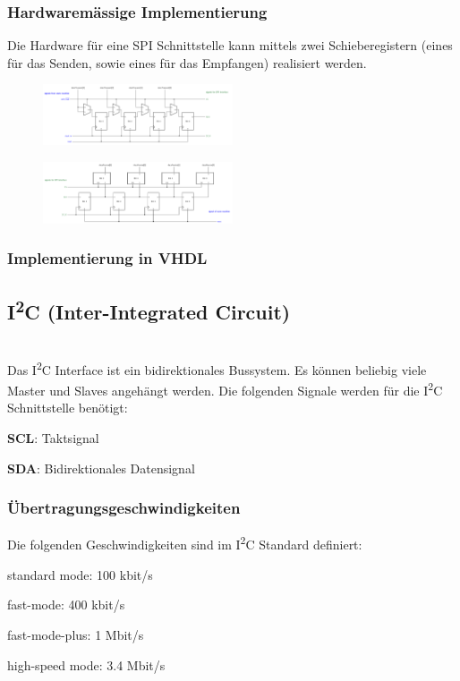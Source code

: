\subsubsection{Hardwaremässige Implementierung}
Die Hardware für eine SPI Schnittstelle kann mittels zwei Schieberegistern (eines für das Senden, sowie eines für das Empfangen) realisiert werden.
\begin{multicols}{2}
    \begin{figure}[H]
        \includegraphics[width=0.5\textwidth]{images/spi_shift1.png}
    \end{figure}
    \begin{figure}[H]
        \includegraphics[width=0.5\textwidth]{images/spi_shift2.png}
    \end{figure}
\end{multicols}

\subsubsection{Implementierung in VHDL}


\subsection{I\textsuperscript{2}C (Inter-Integrated Circuit)}$~$ \\
Das I\textsuperscript{2}C Interface ist ein bidirektionales Bussystem. Es können beliebig viele Master und Slaves angehängt werden. Die folgenden Signale werden für die I\textsuperscript{2}C Schnittstelle benötigt:
\begin{compactitem}
    \item \textbf{SCL}: Taktsignal
    \item \textbf{SDA}: Bidirektionales Datensignal
\end{compactitem}

\subsubsection{Übertragungsgeschwindigkeiten}
Die folgenden Geschwindigkeiten sind im I\textsuperscript{2}C Standard definiert:
\begin{compactitem}
    \item standard mode: 100 kbit/s
    \item fast-mode: 400 kbit/s
    \item fast-mode-plus: 1 Mbit/s
    \item high-speed mode: 3.4 Mbit/s
\end{compactitem}

